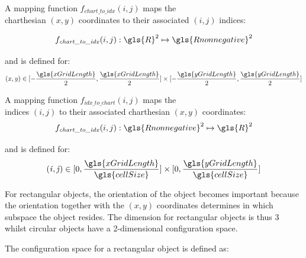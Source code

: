 A mapping function $f_\mathit{chart\_to\_idx}(i,j)$ maps the\\charthesian $(x,y)$ coordinates to their associated $(i,j)$ indices:

\[f_\mathit{chart\_to\_idx}(i,j): \gls{R}^2 \mapsto \gls{Rnonnegative}^2 \]

and is defined for: 
\[ \mathit{(x, y)} \in [-\frac{\gls{xGridLength}}{2}, \frac{\gls{xGridLength}}{2}] \times [-\frac{\gls{yGridLength}}{2}, \frac{\gls{yGridLength}}{2}]\]

A mapping function $f_\mathit{idx\_to\_chart}(i, j)$ maps the\\indices $(i, j)$ to their associated charthesian $(x,y)$ coordinates:
\[f_\mathit{chart\_to\_idx}(i,j): \gls{Rnonnegative}^2  \mapsto \gls{R}^2 \]

and is defined for:
\[ \mathit{(i, j)} \in [0, \frac{\gls{xGridLength}}{\gls{cellSize}}] \times [0, \frac{\gls{yGridLength}}{\gls{cellSize}}]\]

For rectangular objects, the orientation of the object becomes important because the orientation together with the $\mathit{(x, y)}$ coordinates determines in which subspace the object resides. The dimension for rectangular objects is thus 3 whilst circular objects have a 2-dimensional configuration space.\bs

The configuration space for a rectangular object is defined as:\bs

